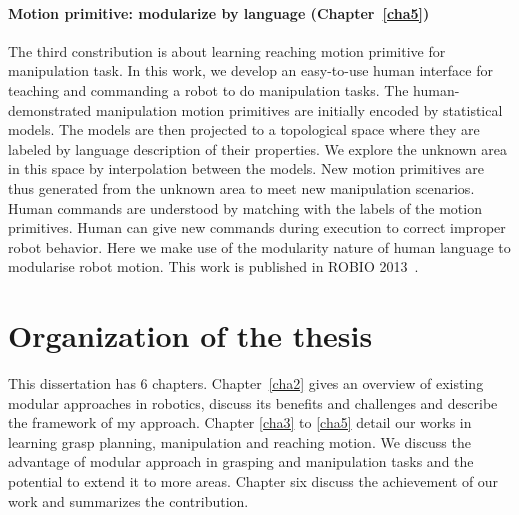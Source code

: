 \paragraph{Motion primitive: modularize by language (Chapter~\ref{cha5})}
The third constribution is about learning reaching motion primitive for manipulation task. In this work, we develop an easy-to-use human interface for teaching and commanding a robot to do manipulation tasks. The human-demonstrated manipulation motion primitives are initially encoded by statistical models. The models are then projected to a topological space where they are labeled by language description of their properties. We explore the unknown area in this space by interpolation between the models. New motion primitives are thus generated from the unknown area to meet new manipulation scenarios.
Human commands are understood by matching with the labels of the motion primitives. Human can give new commands during execution to correct improper robot behavior. Here we make use of the modularity nature of human language to modularise robot motion. This work is published in ROBIO 2013~\citep{bidan2013robio}.






\section{Organization of the thesis}
\label{cha1:organization}
This dissertation has 6 chapters. Chapter~\ref{cha2} gives an overview of existing modular approaches in robotics, discuss its benefits and challenges and describe the framework of my approach. Chapter \ref{cha3} to \ref{cha5} detail our works in learning grasp planning, manipulation and reaching motion. We discuss the advantage of modular approach in grasping and manipulation tasks and the potential to extend it to more areas. Chapter six discuss the achievement of our work and summarizes the contribution.

